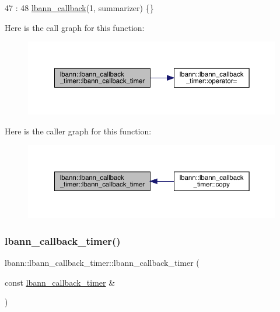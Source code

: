 \begin{DoxyCode}
47                                                             :
48     \hyperlink{classlbann_1_1lbann__callback_a679057298a41ddd47f08c157f756c584}{lbann\_callback}(1, summarizer) \{\}
\end{DoxyCode}
Here is the call graph for this function\+:\nopagebreak
\begin{figure}[H]
\begin{center}
\leavevmode
\includegraphics[width=350pt]{classlbann_1_1lbann__callback__timer_a00fc86ddf14a4a5e9c6b65ff2e81dfb6_cgraph}
\end{center}
\end{figure}
Here is the caller graph for this function\+:\nopagebreak
\begin{figure}[H]
\begin{center}
\leavevmode
\includegraphics[width=350pt]{classlbann_1_1lbann__callback__timer_a00fc86ddf14a4a5e9c6b65ff2e81dfb6_icgraph}
\end{center}
\end{figure}
\mbox{\label{classlbann_1_1lbann__callback__timer_afc366dc61b7d8af5ddce879e46255ee1}} 
\subsubsection{\texorpdfstring{lbann\+\_\+callback\+\_\+timer()}{lbann\_callback\_timer()}\hspace{0.1cm}{\footnotesize\ttfamily [2/2]}}
{\footnotesize\ttfamily lbann\+::lbann\+\_\+callback\+\_\+timer\+::lbann\+\_\+callback\+\_\+timer (\begin{DoxyParamCaption}\item[{const \hyperlink{classlbann_1_1lbann__callback__timer}{lbann\+\_\+callback\+\_\+timer} \&}]{ }\end{DoxyParamCaption})\hspace{0.3cm}{\ttfamily [default]}}

